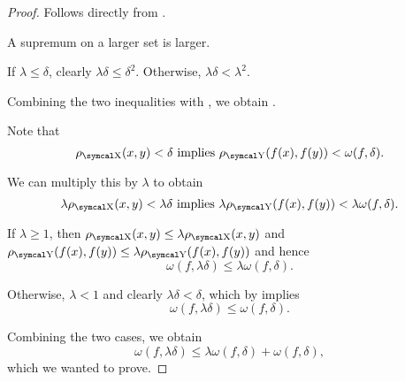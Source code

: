 \begin{proof}
   Follows directly from .

   A supremum on a larger set is larger.

   If \( \lambda \leq \delta \), clearly \( \lambda \delta \leq \delta^2 \). Otherwise, \( \lambda \delta < \lambda^2 \).

  Combining the two inequalities with , we obtain .

   Note that
  \begin{equation*}
    \rho_{\CX}(x, y) < \delta \T{implies} \rho_{\CY}(f(x), f(y)) < \omega(f, \delta).
  \end{equation*}

  We can multiply this by \( \lambda \) to obtain
  \begin{equation*}
    \lambda \rho_{\CX}(x, y) < \lambda \delta \T{implies} \lambda \rho_{\CY}(f(x), f(y)) < \lambda \omega(f, \delta).
  \end{equation*}

  If \( \lambda \geq 1 \), then \( \rho_{\CX}(x, y) \leq \lambda \rho_{\CX}(x, y) \) and \( \rho_{\CY}(f(x), f(y)) \leq \lambda \rho_{\CY}(f(x), f(y)) \) and hence
  \begin{equation*}
    \omega(f, \lambda \delta) \leq \lambda \omega(f, \delta).
  \end{equation*}

  Otherwise, \( \lambda < 1 \) and clearly \( \lambda \delta < \delta \), which by  implies
  \begin{equation*}
    \omega(f, \lambda \delta) \leq \omega(f, \delta).
  \end{equation*}

  Combining the two cases, we obtain
  \begin{equation*}
    \omega(f, \lambda \delta) \leq \lambda \omega(f, \delta) + \omega(f, \delta),
  \end{equation*}
  which we wanted to prove.
\end{proof}
